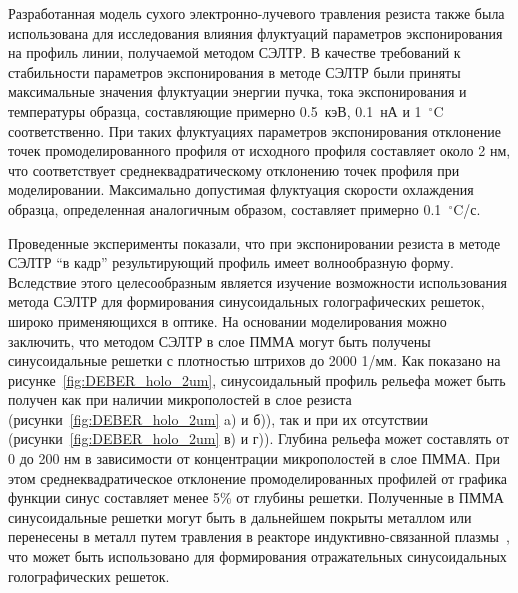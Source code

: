 Разработанная модель сухого электронно-лучевого травления резиста также была использована для исследования влияния флуктуаций параметров экспонирования на профиль линии, получаемой методом СЭЛТР.
В качестве требований к стабильности параметров экспонирования в методе СЭЛТР были приняты максимальные значения флуктуации энергии пучка, тока экспонирования и температуры образца, составляющие примерно 0.5~кэВ, 0.1~нА и 1~$^\circ$C соответственно. При таких флуктуациях параметров экспонирования отклонение точек промоделированного профиля от исходного профиля составляет около 2 нм, что соответствует среднеквадратическому отклонению точек профиля при моделировании.
Максимально допустимая флуктуация скорости охлаждения образца, определенная аналогичным образом, составляет примерно 0.1~$^\circ$C/с.

Проведенные эксперименты показали, что при экспонировании резиста в методе СЭЛТР ``в кадр'' результирующий профиль имеет волнообразную форму.
Вследствие этого целесообразным является изучение возможности использования метода СЭЛТР для формирования синусоидальных голографических решеток, широко применяющихся в оптике.
На основании моделирования можно заключить, что методом СЭЛТР в слое ПММА могут быть получены синусоидальные решетки с плотностью штрихов до 2000 1/мм.
Как показано на рисунке~\ref{fig:DEBER_holo_2um}, синусоидальный профиль рельефа может быть получен как при наличии микрополостей в слое резиста (рисунки~\ref{fig:DEBER_holo_2um} a) и б)), так и при их отсутствии (рисунки~\ref{fig:DEBER_holo_2um} в) и г)).
Глубина рельефа может составлять от 0 до 200 нм в зависимости от концентрации микрополостей в слое ПММА.
При этом среднеквадратическое отклонение промоделированных профилей от графика функции синус составляет менее 5\% от глубины решетки.
Полученные в ПММА синусоидальные решетки могут быть в дальнейшем покрыты металлом или перенесены в металл путем травления в реакторе индуктивно-связанной плазмы~\cite{Bruk_2016_mee}, что может быть использовано для формирования отражательных синусоидальных голографических решеток.


